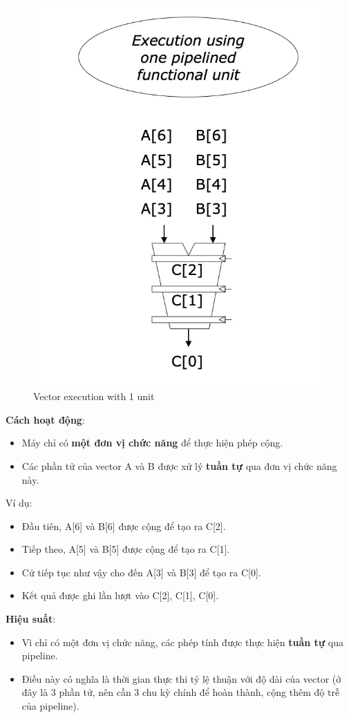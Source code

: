 \documentclass[a4paper]{article}
\begin{document}
\begin{multicols}{2}
\begin{figure}[H]
    \centering
    \includegraphics[width=1\linewidth]{assets/vector-execution-1.png}
    \caption{Vector execution with 1 unit}
    \label{fig:enter-label}
\end{figure}
\columnbreak
\textbf{Cách hoạt động}:
\begin{itemize}
    \item Máy chỉ có \textbf{một đơn vị chức năng} để thực hiện phép cộng.
    \item Các phần tử của vector A và B được xử lý \textbf{tuần tự} qua đơn vị chức năng này.
\end{itemize}
Ví dụ:
\begin{itemize}
    \item Đầu tiên, A[6] và B[6] được cộng để tạo ra C[2].
    \item Tiếp theo, A[5] và B[5] được cộng để tạo ra C[1].
    \item Cứ tiếp tục như vậy cho đến A[3] và B[3] để tạo ra C[0].
    \item Kết quả được ghi lần lượt vào C[2], C[1], C[0].
\end{itemize}
\textbf{Hiệu suất}:
\begin{itemize}
    \item Vì chỉ có một đơn vị chức năng, các phép tính được thực hiện \textbf{tuần tự} qua pipeline.
    \item Điều này có nghĩa là thời gian thực thi tỷ lệ thuận với độ dài của vector (ở đây là 3 phần tử, nên cần 3 chu kỳ chính để hoàn thành, cộng thêm độ trễ của pipeline).
\end{itemize}
\end{multicols}
\end{document}
